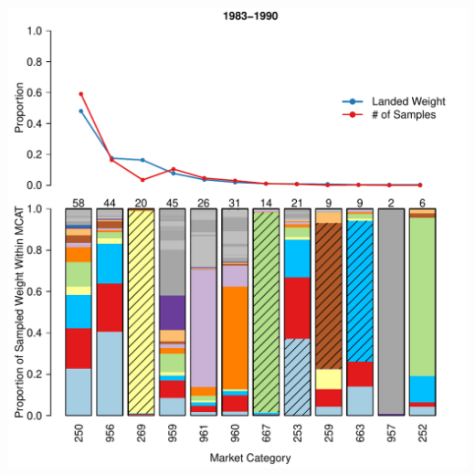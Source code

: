 \documentclass[ xcolor = pdftex, dvipsnames, table ]{beamer}
\begin{document}
%
\begin{frame}
\centering
\includegraphics[height=\textheight]{../pictures/1983to1990Bar3.pdf}

\end{frame}
\end{document}
